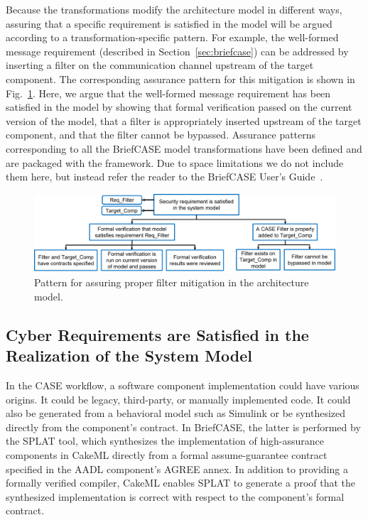 Because the transformations modify the architecture model in different ways, assuring that a specific requirement is satisfied in the model will be argued according to a transformation-specific pattern.  For example, the well-formed message requirement (described in Section~\ref{sec:briefcase}) can be addressed by inserting a filter on the communication channel upstream of the target component.  The corresponding assurance pattern for this mitigation is shown in Fig.~\ref{fig:filter}.  Here, we argue that the well-formed message requirement has been satisfied in the model by showing that formal verification passed on the current version of the model, that a filter is appropriately inserted upstream of the target component, and that the filter cannot be bypassed.  Assurance patterns corresponding to all the BriefCASE model transformations have been defined and are packaged with the framework.  Due to space limitations we do not include them here, but instead refer the reader to the BriefCASE User's Guide~\cite{BriefCASE-user-guide}.

\begin{figure}[h] 
	\centering 
	\includegraphics[width=\textwidth]{figs/filter.png}
	\caption{Pattern for assuring proper filter mitigation in the architecture model.}
	\label{fig:filter} 
\end{figure}

\subsection{Cyber Requirements are Satisfied in the Realization of the System Model}

In the CASE workflow, a software component implementation could have various origins.  It could be legacy, third-party, or manually implemented code. It could also be generated from a behavioral model such as Simulink or be synthesized directly from the component's contract.  In BriefCASE, the latter is performed by the SPLAT tool, which synthesizes the implementation of high-assurance components in CakeML directly from a formal assume-guarantee contract specified in the AADL component's AGREE annex.  In addition to providing a formally verified compiler, CakeML enables SPLAT to generate a proof that the synthesized implementation is correct with respect to the component's formal contract.

